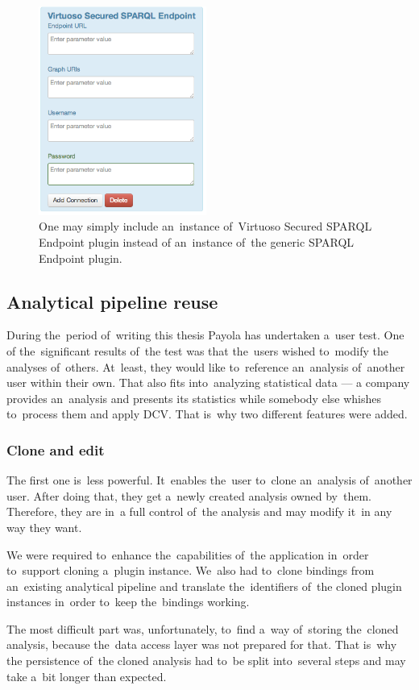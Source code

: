 \begin{figure}
	\centering
	\includegraphics[width=55mm]{img/secured.png}
	\caption{One may simply include an~instance of~Virtuoso Secured SPARQL Endpoint plugin instead
	of an~instance of~the generic SPARQL Endpoint plugin.}
	\label{fig:secured-ds}
\end{figure}

\subsection{Analytical pipeline reuse}
During the~period of~writing this thesis Payola has undertaken a~user test. One 
of the~significant results of~the test was that the~users wished to~modify the
analyses of~others. At~least, they would like to~reference an~analysis of~another user within their own. That also fits into~analyzing statistical data --- 
a company provides an~analysis and presents its statistics while somebody else 
whishes to~process them and apply DCV. That is~why two different features 
were added.

\subsubsection{Clone and edit}
The first one is~less powerful. It~enables the~user to~clone an~analysis of~another user. After doing that, they get a~newly created analysis owned by~them. Therefore, they are in~a full control of~the analysis and may modify it~in 
any way they want.

We were required to~enhance the~capabilities of~the application in~order to~support cloning a~plugin instance. We~also had to~clone bindings from an~existing analytical pipeline and translate the~identifiers of~the cloned plugin 
instances in~order to~keep the~bindings working.

The most difficult part was, unfortunately, to~find a~way of~storing the~cloned 
analysis, because the~data access layer was not prepared for that. That is~why
the persistence of~the cloned analysis had to~be split into~several steps and may take a~bit longer than expected.

